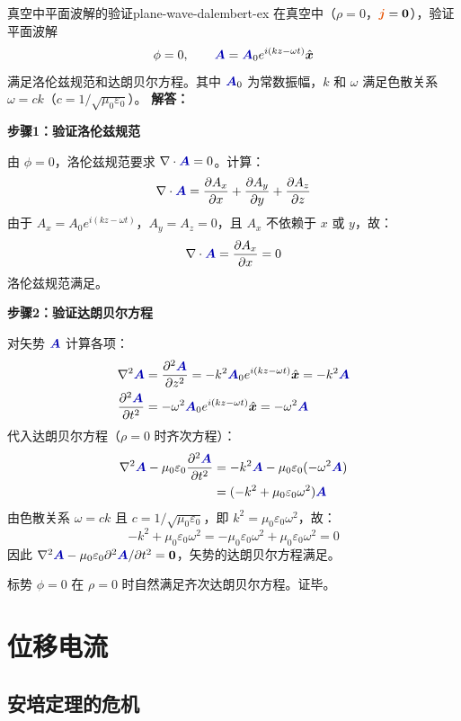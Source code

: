 \documentclass[11pt,a4paper,openany,oneside]{book}
\newcommand{\vecJ}{\textcolor{cororange}{\vect{j}}}
\newcommand{\vecA}{\textcolor{blue!70!black}{\vect{A}}}
\newcommand{\eps}{\varepsilon}
\newcommand{\muz}{\mu_0}
\newcommand{\vect}[1]{\bm{#1}}
\newcommand{\unitvec}[1]{\hat{\vect{#1}}}
\newcommand{\lap}{\nabla^2}
\newcommand{\difficulty}[1]{\marginnote{\textcolor{red}{\textbf{[#1]}}}}
\begin{document}
\begin{example}{真空中平面波解的验证}{plane-wave-dalembert-ex}
\difficulty{基础}
在真空中（$\rho = 0$，$\vecJ = \vect{0}$），验证平面波解
\[
\phi = 0, \qquad \vecA = \vecA_0 e^{i(kz-\omega t)}\unitvec{x}
\]
满足洛伦兹规范和达朗贝尔方程。其中 $\vecA_0$ 为常数振幅，$k$ 和 $\omega$ 满足色散关系 $\omega = ck$（$c = 1/\sqrt{\muz\eps_0}$）。
\tcblower
\textbf{解答：}

\textbf{步骤1：验证洛伦兹规范}

由 $\phi = 0$，洛伦兹规范要求 $\nabla\cdot\vecA = 0$。计算：
\[
\nabla\cdot\vecA = \frac{\partial A_x}{\partial x} + \frac{\partial A_y}{\partial y} + \frac{\partial A_z}{\partial z}
\]
由于 $A_x = A_0 e^{i(kz-\omega t)}$，$A_y = A_z = 0$，且 $A_x$ 不依赖于 $x$ 或 $y$，故：
\[
\nabla\cdot\vecA = \frac{\partial A_x}{\partial x} = 0
\]
洛伦兹规范满足。

\textbf{步骤2：验证达朗贝尔方程}

对矢势 $\vecA$ 计算各项：
\begin{align*}
\lap\vecA &= \frac{\partial^2\vecA}{\partial z^2} = -k^2 \vecA_0 e^{i(kz-\omega t)}\unitvec{x} = -k^2\vecA \\
\frac{\partial^2\vecA}{\partial t^2} &= -\omega^2 \vecA_0 e^{i(kz-\omega t)}\unitvec{x} = -\omega^2\vecA
\end{align*}
代入达朗贝尔方程（$\rho=0$ 时齐次方程）：
\begin{align*}
\lap\vecA - \muz\eps_0\frac{\partial^2\vecA}{\partial t^2} &= -k^2\vecA - \muz\eps_0(-\omega^2\vecA) \\
&= (-k^2 + \muz\eps_0\omega^2)\vecA
\end{align*}
由色散关系 $\omega = ck$ 且 $c = 1/\sqrt{\muz\eps_0}$，即 $k^2 = \muz\eps_0\omega^2$，故：
\[
-k^2 + \muz\eps_0\omega^2 = -\muz\eps_0\omega^2 + \muz\eps_0\omega^2 = 0
\]
因此 $\lap\vecA - \muz\eps_0\partial^2\vecA/\partial t^2 = \vect{0}$，矢势的达朗贝尔方程满足。

标势 $\phi = 0$ 在 $\rho = 0$ 时自然满足齐次达朗贝尔方程。证毕。
\end{example}

\section{位移电流}

\subsection{安培定理的危机}
\end{document}
